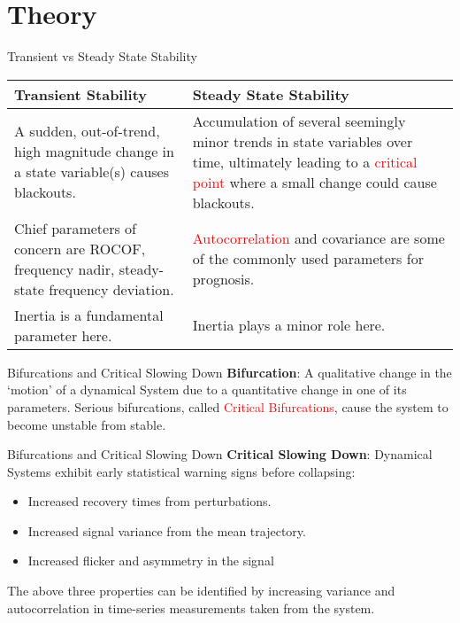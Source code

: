 \section[Theory]{Theory}
\label{sec:lasso_theory}

\begin{frame}[fragile]{Transient vs Steady State Stability}
	\begin{tabularx}{\textwidth}{
			@{\hspace{1.5em}}%
			>{\leavevmode\raggedright}%
			X%
			@{\quad\hspace{1.5em}}%
			>{\leavevmode\raggedright\arraybackslash}%
			X%
			@{}%
		}
		\textbf{Transient Stability} & \textbf{Steady State Stability}\\
		\toprule
		A sudden, out-of-trend, high magnitude change in a state variable(s) causes blackouts. & 
		Accumulation of several seemingly minor trends in state variables over time, ultimately leading to a \textcolor{red}{critical point} where a small change could cause blackouts.\\
		Chief parameters of concern are ROCOF, frequency nadir, steady-state frequency deviation. & 
		\textcolor{red}{Autocorrelation} and covariance are some of the commonly used parameters for prognosis.\\
		Inertia is a fundamental parameter here. & Inertia plays a minor role here.\\
		\bottomrule
	\end{tabularx}
\end{frame}

\begin{frame}{Bifurcations and Critical Slowing Down}
	\textbf{Bifurcation}: A qualitative change in the `motion' of a dynamical System due to a quantitative change in one of its parameters. Serious bifurcations, called \textcolor{red}{Critical Bifurcations}, cause the system to become unstable from stable.
\end{frame}

\begin{frame}{Bifurcations and Critical Slowing Down}
	\textbf{Critical Slowing Down}: Dynamical Systems exhibit early statistical warning signs before collapsing:
	
	\begin{itemize}
		\item Increased recovery times from perturbations.
		\item Increased signal variance from the mean trajectory.
		\item Increased flicker and asymmetry in the signal
	\end{itemize}
	
	The above three properties can be identified by increasing variance and autocorrelation in time-series measurements taken from the system.
\end{frame}
